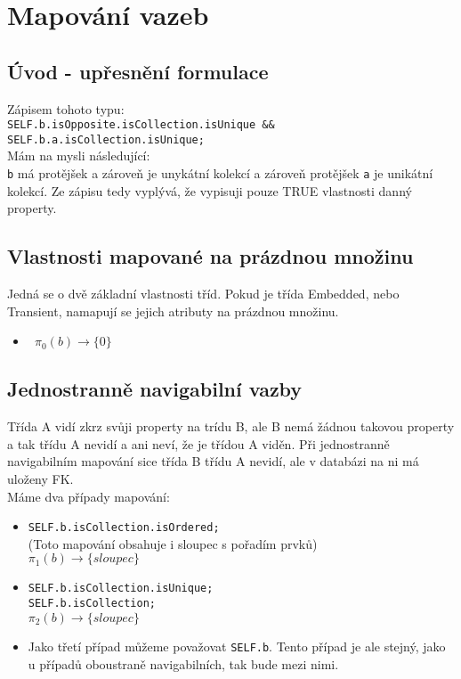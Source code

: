 \documentclass[11pt,a4paper]{article}
\begin{document}
\section{Mapování vazeb}
	\subsection{Úvod - upřesnění formulace}
	Zápisem tohoto typu:\\ 
	\texttt	{SELF.b.isOpposite.isCollection.isUnique \&\& SELF.b.a.isCollection.isUnique; \\} 
	Mám na mysli následující:\\
	\texttt{b} má protějšek a zároveň je unykátní kolekcí a zároveň protějšek \texttt {a} je unikátní kolekcí.
	Ze zápisu tedy vyplývá, že vypisuji pouze TRUE vlastnosti danný property. 		  							
	                                
	\subsection{Vlastnosti mapované na prázdnou množinu}
   		Jedná se o dvě základní vlastnosti tříd. Pokud je třída Embedded, nebo
   		Transient, namapují se jejich atributy na prázdnou množinu. 
   		\begin{itemize}				    
         	\item \texttt	{
         					$\pi_0(b) \to \{ 0\}$  
         					}
   		\end{itemize}
   	\subsection{Jednostranně navigabilní vazby}
   		Třída A vidí zkrz svůji property na trídu B, ale B nemá žádnou takovou property a 
   		tak třídu A nevidí a ani neví, že je třídou A viděn. Při jednostranně navigabilním
   		mapování sice třída B třídu A nevidí, ale v databázi na ni má uloženy FK.
   		\\
   		Máme dva případy mapování:
   		\begin{itemize}				    
         	\item \texttt	{SELF.b.isCollection.isOrdered; \\}
         					(Toto mapování obsahuje i sloupec s pořadím prvků) \\
         					$\pi_1(b) \to \{ sloupec\}$
         					
         	\item \texttt	{SELF.b.isCollection.isUnique; \\
         					 SELF.b.isCollection; \\
         					$\pi_2(b) \to \{ sloupec\}$
         					}
         	\item Jako třetí případ můžeme považovat \texttt   {SELF.b}. Tento případ je ale stejný, 
         	jako u případů oboustraně navigabilních, tak bude mezi nimi.
         		  							
   		\end{itemize}
\end{document}
